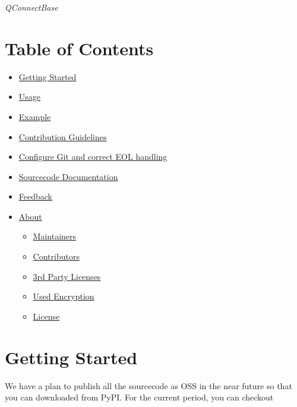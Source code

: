 %
%

\emph{QConnectBase}

\hypertarget{description-table-of-contents}{%
\section{Table of Contents}\label{description-table-of-contents}}

\begin{itemize}
\tightlist
\item
  \protect\hyperlink{getting-started}{Getting Started}
\item
  \protect\hyperlink{building-and-testing}{Usage}
\item
  \protect\hyperlink{example}{Example}
\item
  \protect\hyperlink{contribution-guidelines}{Contribution Guidelines}
\item
  \protect\hyperlink{configure-Git-and-correct-EOL-handling}{Configure
  Git and correct EOL handling}
\item
  \protect\hyperlink{documentation}{Sourcecode Documentation}
\item
  \protect\hyperlink{feedback}{Feedback}
\item
  \protect\hyperlink{about}{About}

  \begin{itemize}
  \tightlist
  \item
    \protect\hyperlink{maintainers}{Maintainers}
  \item
    \protect\hyperlink{contributors}{Contributors}
  \item
    \protect\hyperlink{3rd-party-licenses}{3rd Party Licenses}
  \item
    \protect\hyperlink{used-encryption}{Used Encryption}
  \item
    \protect\hyperlink{license}{License}
  \end{itemize}
\end{itemize}

\hypertarget{description-getting-started}{%
\section{Getting Started}\label{description-getting-started}}

We have a plan to publish all the sourcecode as OSS in the near future
so that you can downloaded from PyPI. For the current period, you can
checkout

